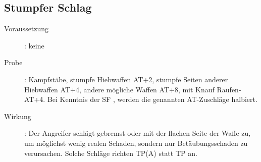 \subsection{Stumpfer Schlag}
\label{aktion.stumpfer_schlag}
\begin{description}
    \item[Voraussetzung]:
        keine
    \item[Probe]:
        Kampfstäbe, stumpfe Hiebwaffen AT+2, stumpfe Seiten anderer Hiebwaffen AT+4, andere mögliche Waffen AT+8, mit Knauf Raufen-AT+4.
        Bei Kenntnis der SF , werden die genannten AT-Zuschläge halbiert.
    \item[Wirkung]:
        Der Angreifer schlägt gebremst oder mit der flachen Seite der Waffe zu, um möglichst wenig realen Schaden, sondern nur Betäubungsschaden zu verursachen.
        Solche Schläge richten TP(A) statt TP an.
\end{description}
